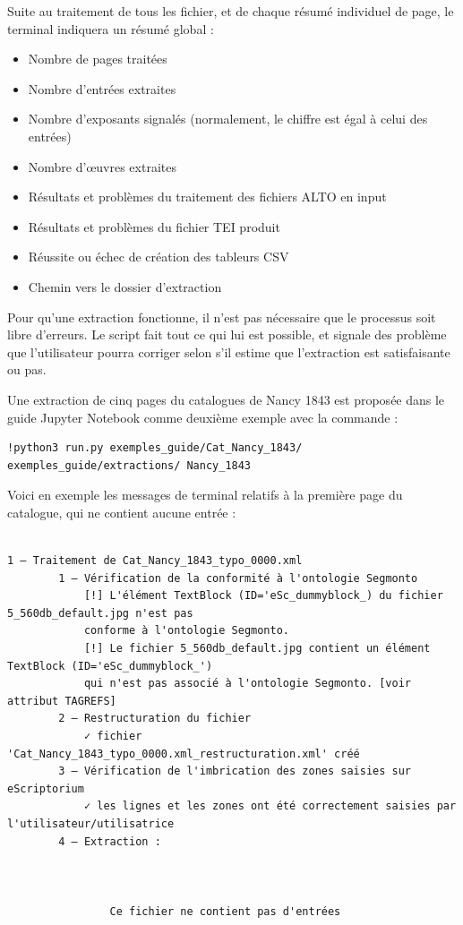 \documentclass[a4paper,12pt,twoside]{book}
\begin{document}
Suite au traitement de tous les fichier, et de chaque résumé individuel de page, le terminal indiquera un résumé global :
\begin{itemize}
	\item Nombre de pages traitées
	\item Nombre d'entrées extraites
	\item Nombre d'exposants signalés (normalement, le chiffre est égal à celui des entrées)
	\item Nombre d'œuvres extraites
	\item Résultats et problèmes du traitement des fichiers ALTO en input
	\item Résultats et problèmes du fichier TEI produit
	\item Réussite ou échec de création des tableurs CSV
	\item Chemin vers le dossier d'extraction
\end{itemize}


Pour qu'une extraction fonctionne, il n'est pas nécessaire que le processus soit libre d'erreurs. Le script fait tout ce qui lui est possible, et signale des problème que l'utilisateur pourra corriger selon s'il estime que l'extraction est satisfaisante ou pas.

Une extraction de cinq pages du catalogues de Nancy 1843 est proposée dans le guide Jupyter Notebook comme deuxième exemple avec la commande : 
\begin{footnotesize}
	\begin{verbatim}
!python3 run.py exemples_guide/Cat_Nancy_1843/ exemples_guide/extractions/ Nancy_1843
	\end{verbatim}
\end{footnotesize}

Voici en exemple les messages de terminal relatifs à la première page du catalogue, qui ne contient aucune entrée : 

\begin{scriptsize}
	\begin{verbatim}

1 – Traitement de Cat_Nancy_1843_typo_0000.xml
		1 – Vérification de la conformité à l'ontologie Segmonto
			[!] L'élément TextBlock (ID='eSc_dummyblock_) du fichier 5_560db_default.jpg n'est pas 
			conforme à l'ontologie Segmonto. 
			[!] Le fichier 5_560db_default.jpg contient un élément TextBlock (ID='eSc_dummyblock_') 
			qui n'est pas associé à l'ontologie Segmonto. [voir attribut TAGREFS]
		2 – Restructuration du fichier
			✓ fichier 'Cat_Nancy_1843_typo_0000.xml_restructuration.xml' créé
		3 – Vérification de l'imbrication des zones saisies sur eScriptorium 
			✓ les lignes et les zones ont été correctement saisies par l'utilisateur/utilisatrice 
		4 – Extraction :



				Ce fichier ne contient pas d'entrées


	\end{verbatim}
\end{scriptsize}
\end{document}
